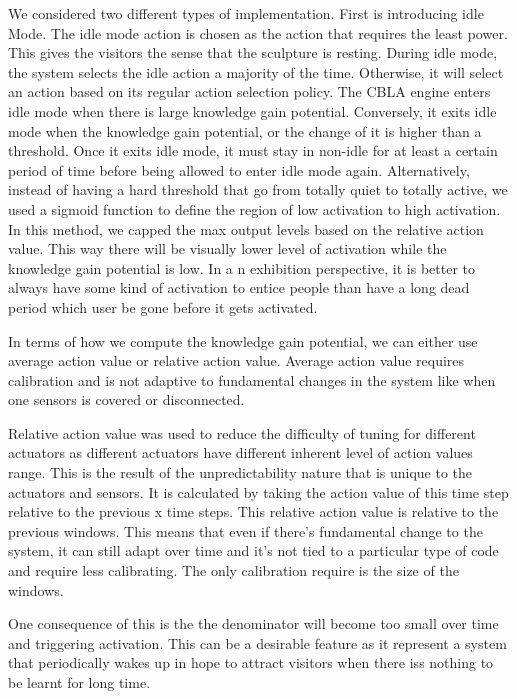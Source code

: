 We considered two different types of implementation. First is introducing idle Mode. The idle mode action is chosen as the action that requires the least power. This gives the visitors the sense that the sculpture is resting. During idle mode, the system selects the idle action a majority of the time. Otherwise, it will select an action based on its regular action selection policy. The CBLA engine enters idle mode when there is large knowledge gain potential. Conversely, it exits idle mode when the knowledge gain potential, or the change of it is higher than a threshold. Once it exits idle mode, it must stay in non-idle for at least a certain period of time before being allowed to enter idle mode again. 
Alternatively, instead of having a hard threshold that go from totally quiet to totally active, we used a sigmoid function to define the region of low activation to high activation. In this method, we capped the max output levels based on the relative action value. This way there will be visually lower level of activation while the knowledge gain potential is low. In a n exhibition perspective, it is better to always have some kind of activation to entice people than have a long dead period which user be gone before it gets activated.

In terms of how we compute the knowledge gain potential, we can either use average action value or relative action value. Average action value requires calibration and is not adaptive to fundamental changes in the system like when one sensors is covered or disconnected. 

Relative action value was used to reduce the difficulty of tuning for different actuators as different actuators have different inherent level of action values range. This is the result of the unpredictability nature that is unique to the actuators and sensors. It is calculated by taking the action value of this time step relative to the previous x time steps. This relative action value is relative to the previous windows. This means that even if there's fundamental change to the system, it can still adapt over time and it's not tied to a particular type of code and require less calibrating. The only calibration require is the size of the windows. 

One consequence of this is the the denominator will become too small over time and triggering activation. This can be a desirable feature as it represent a system that periodically wakes up in hope to attract visitors when there iss nothing to be learnt for long time.

